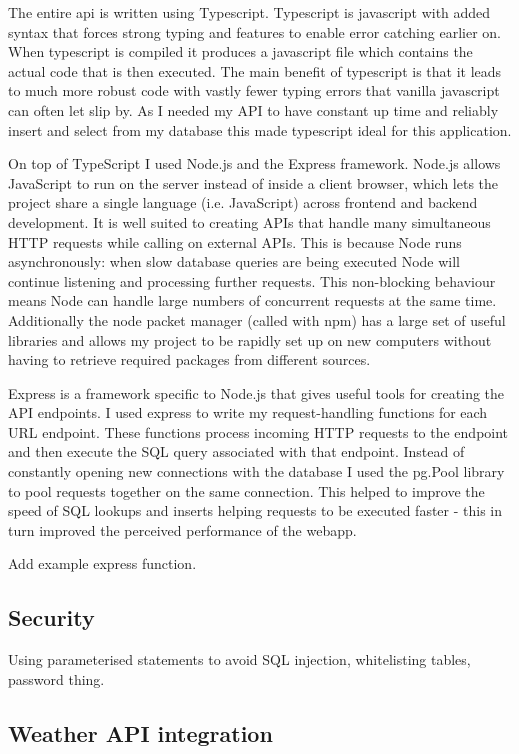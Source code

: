 The entire api is written using Typescript. Typescript is javascript with added
syntax that forces strong typing and features to enable error catching earlier
on. When typescript is compiled it produces a javascript file which contains the
actual code that is then executed. The main benefit of typescript is that it
leads to much more robust code with vastly fewer typing errors that vanilla
javascript can often let slip by. As I needed my API to have constant up time
and reliably insert and select from my database this made typescript ideal for
this application.

On top of TypeScript I used Node.js and the Express framework. Node.js allows
JavaScript to run on the server instead of inside a client browser, which lets
the project share a single language (i.e. JavaScript) across frontend and
backend development. It is well suited to creating APIs that handle many
simultaneous HTTP requests while calling on external APIs. This is because Node
runs asynchronously: when slow database queries are being executed Node will
continue listening and processing further requests. This non-blocking behaviour
means Node can handle large numbers of concurrent requests at the same time.
Additionally the node packet manager (called with npm) has a large set of useful
libraries and allows my project to be rapidly set up on new computers without
having to retrieve required packages from different sources.

Express is a framework specific to Node.js that gives useful tools for creating
the API endpoints. I used express to write my request-handling functions for
each URL endpoint. These functions process incoming HTTP requests to the
endpoint and then execute the SQL query associated with that endpoint. Instead
of constantly opening new connections with the database I used the pg.Pool
library to pool requests together on the same connection. This helped to improve
the speed of SQL lookups and inserts helping requests to be executed faster -
this in turn improved the perceived performance of the webapp.

Add example express function.

\subsection{Security}

Using parameterised statements to avoid SQL injection, whitelisting tables,
password thing.


\subsection{Weather API integration}

